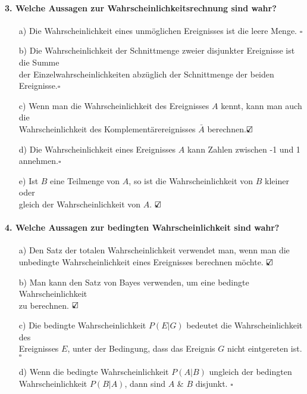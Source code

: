 \documentclass[a4paper]{article}
\begin{document}
\paragraph{3. Welche Aussagen zur Wahrscheinlichkeitsrechnung sind wahr?} 
\begin{itemize}
    \item[a)] Die Wahrscheinlichkeit eines unmöglichen Ereignisses ist die leere Menge. \hfill $\square$
    \item[b)] Die Wahrscheinlichkeit der Schnittmenge zweier disjunkter Ereignisse ist die Summe\\ der Einzelwahrscheinlichkeiten abzüglich der  Schnittmenge der beiden Ereignisse.\hfill $\square$
    \item[c)] Wenn man die Wahrscheinlichkeit des Ereignisses $A$ kennt, kann man auch die\\ Wahrscheinlichkeit des Komplementärereignisses $\bar A$ berechnen.\hfill $\text{\rlap{$\checkmark$}}\square$
    \item[d)] Die Wahrscheinlichkeit eines Ereignisses $A$ kann Zahlen zwischen -1 und 1 annehmen.\hfill $\square$
    \item[e)] Ist $B$ eine Teilmenge von $A$, so ist die Wahrscheinlichkeit von $B$ kleiner oder \\gleich der Wahrscheinlichkeit von $A$. \hfill $\text{\rlap{$\checkmark$}}\square$
\end{itemize}

\paragraph{4. Welche Aussagen zur bedingten Wahrscheinlichkeit sind wahr?}
\begin{itemize}
    \item[a)] Den Satz der totalen Wahrscheinlichkeit verwendet man, wenn man die \\unbedingte Wahrscheinlichkeit eines Ereignisses berechnen möchte. \hfill $\text{\rlap{$\checkmark$}}\square$
    \item[b)] Man kann den Satz von Bayes verwenden, um eine bedingte Wahrscheinlichkeit\\ zu berechnen. \hfill $\text{\rlap{$\checkmark$}}\square$
    \item[c)] Die bedingte Wahrscheinlichkeit $P(E|G)$ bedeutet die Wahrscheinlichkeit des\\ Ereignisses $E$, unter der Bedingung, dass das Ereignis $G$ nicht eintgereten ist. \hfill $\square$
    \item[d)] Wenn die bedingte Wahrscheinlichkeit $P(A|B)$ ungleich der bedingten\\Wahrscheinlichkeit $P(B|A)$, dann sind $A$ \& $B$ disjunkt. \hfill $\square$
\end{itemize}
\end{document}
